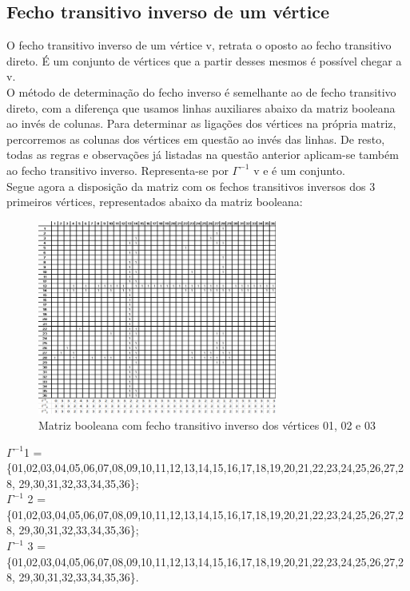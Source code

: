 \subsection{ Fecho transitivo inverso de um vértice }
O fecho transitivo inverso de um vértice v, retrata o oposto ao fecho transitivo direto. É um conjunto de 
vértices que a partir desses mesmos é possível chegar a v.\\
\indent O método de determinação do fecho inverso é semelhante ao de fecho transitivo direto, com a diferença 
que usamos linhas auxiliares abaixo da matriz booleana ao invés de colunas. Para determinar as ligações dos 
vértices na própria matriz, percorremos as colunas dos vértices em questão ao invés das linhas. De resto, todas as 
regras e observações já listadas na questão anterior aplicam-se também ao fecho transitivo inverso. Representa-se por $\Gamma^{-1}$ v e é um conjunto.\\ 
\indent Segue agora a disposição da matriz com os fechos transitivos inversos dos 3 primeiros vértices, representados abaixo da matriz booleana:
\begin{figure}[h]
    \centering
    \includegraphics[width=0.7\textwidth]{imgs/Figura15}
    \caption{Matriz booleana com fecho transitivo inverso dos vértices 01, 02 e 03\label{fig:imagem16}}
\end{figure}\clearpage
\indent $\Gamma^{-1}$1 =\\
\{01,02,03,04,05,06,07,08,09,10,11,12,13,14,15,16,17,18,19,20,21,22,23,24,25,26,27,28,
29,30,31,32,33,34,35,36\};\\
\indent $\Gamma^{-1}$ 2 =\\
\{01,02,03,04,05,06,07,08,09,10,11,12,13,14,15,16,17,18,19,20,21,22,23,24,25,26,27,28,
29,30,31,32,33,34,35,36\};\\
\indent $\Gamma^{-1}$ 3 =\\
\{01,02,03,04,05,06,07,08,09,10,11,12,13,14,15,16,17,18,19,20,21,22,23,24,25,26,27,28,
29,30,31,32,33,34,35,36\}.\\

